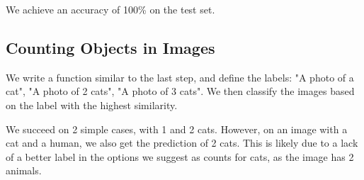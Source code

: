 \documentclass{article}
\begin{document}
We achieve an accuracy of 100\% on the test set.

\subsection{Counting Objects in Images}
We write a function similar to the last step, and define the labels: "A photo of a cat", "A photo of 2 cats", "A photo of 3 cats". We then classify the images based on the label with the highest similarity. 

We succeed on 2 simple cases, with 1 and 2 cats. However, on an image with a cat and a human, we also get the prediction of 2 cats. 
This is likely due to a lack of a better label in the options we suggest as counts for cats, as the image has 2 animals.
\end{document}
